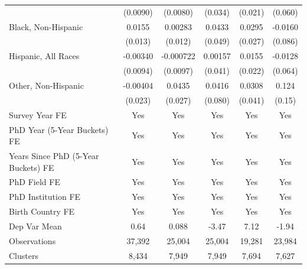 \begin{table}[htbp]
\begin{tabular}{l*{5}{c}}
  &    (0.0090)         &    (0.0080)         &     (0.034)         &     (0.021)         &     (0.060)         \\
[1em]
Black, Non-Hispanic&      0.0155         &     0.00283         &      0.0433         &      0.0295         &     -0.0160         \\
  &     (0.013)         &     (0.012)         &     (0.049)         &     (0.027)         &     (0.086)         \\
[1em]
Hispanic, All Races&    -0.00340         &   -0.000722         &     0.00157         &      0.0155         &     -0.0128         \\
  &    (0.0094)         &    (0.0097)         &     (0.041)         &     (0.022)         &     (0.064)         \\
[1em]
Other, Non-Hispanic&    -0.00404         &      0.0435         &      0.0416         &      0.0308         &       0.124         \\
  &     (0.023)         &     (0.027)         &     (0.080)         &     (0.041)         &      (0.15)         \\
[1em]
Survey Year FE&         Yes         &         Yes         &         Yes         &         Yes         &         Yes         \\
[1em]
PhD Year (5-Year Buckets) FE&         Yes         &         Yes         &         Yes         &         Yes         &         Yes         \\
[1em]
Years Since PhD (5-Year Buckets) FE&         Yes         &         Yes         &         Yes         &         Yes         &         Yes         \\
[1em]
PhD Field FE&         Yes         &         Yes         &         Yes         &         Yes         &         Yes         \\
[1em]
PhD Institution FE&         Yes         &         Yes         &         Yes         &         Yes         &         Yes         \\
[1em]
Birth Country FE&         Yes         &         Yes         &         Yes         &         Yes         &         Yes         \\
\hline
Dep Var Mean&        0.64         &       0.088         &       -3.47         &        7.12         &       -1.94         \\
Observations&      37,392         &      25,004         &      25,004         &      19,281         &      23,984         \\
Clusters&       8,434         &       7,949         &       7,949         &       7,694         &       7,627         \\

\end{tabular}
\end{table}

